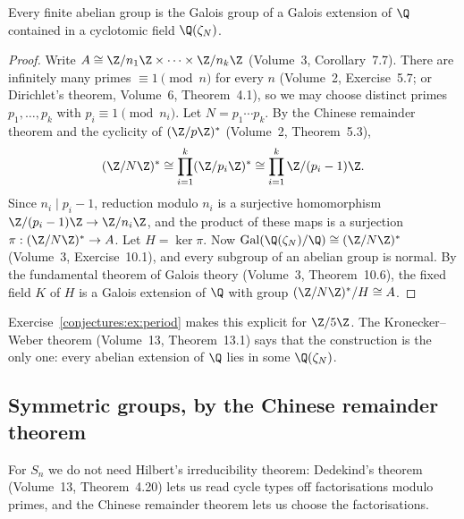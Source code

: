 \begin{theorem}\label{conjectures:thm:abelian}
Every finite abelian group is the Galois group of a Galois extension of $\Q$ contained in a cyclotomic field $\Q(\zeta_N)$.
\end{theorem}
\begin{proof}
Write $A\cong\Z/n_1\Z\times\dots\times\Z/n_k\Z$ (Volume~3, Corollary~7.7). There are infinitely many primes $\equiv1\pmod n$ for every $n$ (Volume~2,
Exercise~5.7; or Dirichlet's theorem, Volume~6, Theorem~4.1), so we may choose distinct primes $p_1,\dots,p_k$ with $p_i\equiv1\pmod{n_i}$. Let
$N=p_1\cdots p_k$. By the Chinese remainder theorem and the cyclicity of $(\Z/p\Z)^*$ (Volume~2, Theorem~5.3),
\[
(\Z/N\Z)^*\cong\prod_{i=1}^k(\Z/p_i\Z)^*\cong\prod_{i=1}^k\Z/(p_i-1)\Z.
\]
Since $n_i\mid p_i-1$, reduction modulo $n_i$ is a surjective homomorphism $\Z/(p_i-1)\Z\to\Z/n_i\Z$, and the product of these maps is a surjection
$\pi:(\Z/N\Z)^*\to A$. Let $H=\ker\pi$. Now $\operatorname{Gal}(\Q(\zeta_N)/\Q)\cong(\Z/N\Z)^*$ (Volume~3, Exercise~10.1), and every subgroup of an abelian
group is normal. By the fundamental theorem of Galois theory (Volume~3, Theorem~10.6), the fixed field $K$ of $H$ is a Galois extension of $\Q$ with group
$(\Z/N\Z)^*/H\cong A$.
\end{proof}

Exercise~\ref{conjectures:ex:period} makes this explicit for $\Z/5\Z$. The Kronecker--Weber theorem (Volume~13, Theorem~13.1) says that the construction is the only one:
every abelian extension of $\Q$ lies in some $\Q(\zeta_N)$.

\subsection*{Symmetric groups, by the Chinese remainder theorem}

For $S_n$ we do not need Hilbert's irreducibility theorem: Dedekind's theorem (Volume~13, Theorem~4.20) lets us read cycle types off factorisations modulo
primes, and the Chinese remainder theorem lets us choose the factorisations.


